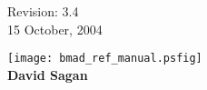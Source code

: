 \thispagestyle{empty}

\begin{flushright}
\large
  Revision: 3.4 \\
  15 October, 2004 \\
\end{flushright}

\vfill

{
\begin{center}
\texttt{[image: bmad\_ref\_manual.psfig]} \\
\vskip 0.3in
\huge\bf David Sagan
\end{center}
}

\vfill
\break